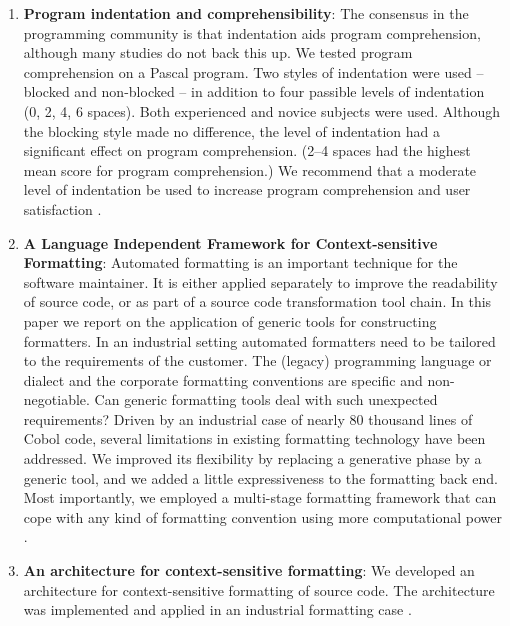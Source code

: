 \begin{englishtext}
\begin{enumerate}
    \item \textbf{Program indentation and comprehensibility}: The consensus in the
    programming community is that indentation aids program comprehension,
    although many studies do not back this up. We tested program comprehension
    on a Pascal program. Two styles of indentation were used -- blocked and
    non-blocked -- in addition to four passible levels of indentation
    (0, 2, 4, 6 spaces). Both experienced and novice subjects were used.
    Although the blocking style made no difference, the level of indentation had
    a significant effect on program comprehension. (2--4 spaces had the highest
    mean score for program comprehension.) We recommend that a moderate level
    of indentation be used to increase program comprehension and user
    satisfaction \cite{programIndentation}.

    \item \textbf{A Language Independent Framework for Context-sensitive
    Formatting}: Automated formatting is an important technique for the software
    maintainer. It is either applied separately to improve the readability of
    source code, or as part of a source code transformation tool chain. In this
    paper we report on the application of generic tools for constructing
    formatters. In an industrial setting automated formatters need to be
    tailored to the requirements of the customer. The (legacy) programming
    language or dialect and the corporate formatting conventions are specific
    and non-negotiable. Can generic formatting tools deal with such unexpected
    requirements? Driven by an industrial case of nearly 80 thousand lines of
    Cobol code, several limitations in existing formatting technology have been
    addressed. We improved its flexibility by replacing a generative phase by a
    generic tool, and we added a little expressiveness to the formatting back
    end. Most importantly, we employed a multi-stage formatting framework that
    can cope with any kind of formatting convention using more computational
    power \cite{independentFramework}.

    \item \textbf{An architecture for context-sensitive formatting}: We
    developed an architecture for context-sensitive formatting of source code.
    The architecture was implemented and applied in an industrial formatting
    case \cite{architectureFormatting}.


\end{enumerate}
\end{englishtext}
